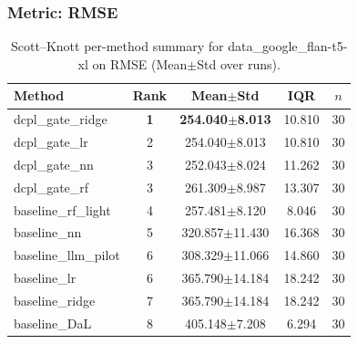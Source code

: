 \subsubsection*{Metric: RMSE}
\begin{table}[H]
\centering
\scriptsize
\setlength{\tabcolsep}{4pt}
\renewcommand{\arraystretch}{1.1}
\caption{Scott--Knott per-method summary for data\_google\_flan-t5-xl on RMSE (Mean$\pm$Std over runs).}
\label{tab:sk_data_google_flan-t5-xl_RMSE}
\begin{tabular}{l|c|c|c|c}
\hline
\textbf{Method} & \textbf{Rank} & \textbf{Mean$\pm$Std} & \textbf{IQR} & \textbf{$n$} \\
\hline
\rowcolor{red!15} dcpl\_gate\_ridge & \textbf{1} & \textbf{254.040$\pm$8.013} & 10.810 & 30 \\
dcpl\_gate\_lr & 2 & 254.040$\pm$8.013 & 10.810 & 30 \\
dcpl\_gate\_nn & 3 & 252.043$\pm$8.024 & 11.262 & 30 \\
dcpl\_gate\_rf & 3 & 261.309$\pm$8.987 & 13.307 & 30 \\
baseline\_rf\_light & 4 & 257.481$\pm$8.120 & 8.046 & 30 \\
baseline\_nn & 5 & 320.857$\pm$11.430 & 16.368 & 30 \\
baseline\_llm\_pilot & 6 & 308.329$\pm$11.066 & 14.860 & 30 \\
baseline\_lr & 6 & 365.790$\pm$14.184 & 18.242 & 30 \\
baseline\_ridge & 7 & 365.790$\pm$14.184 & 18.242 & 30 \\
baseline\_DaL & 8 & 405.148$\pm$7.208 & 6.294 & 30 \\
\hline
\end{tabular}
\end{table}

